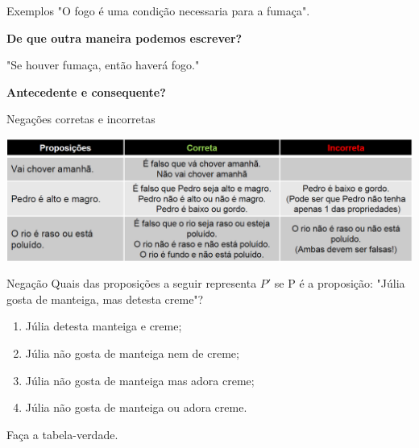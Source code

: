 \documentclass[aspectratio=169]{beamer}
\begin{document}
\begin{frame}{Exemplos}
    "O fogo é uma condição necessaria para a fumaça".
    \vspace{1cm}

    \textbf{De que outra maneira podemos escrever?}
    \vspace{1cm}

    "Se houver fumaça, então haverá fogo."
    \vspace{1.5cm}

    \textbf{Antecedente e consequente?}

\end{frame}

\begin{frame}{Negações corretas e incorretas}

    \begin{center}
        \includegraphics[width=.8\linewidth]{figs/tabelanegacoes.png}
    \end{center}

\end{frame}

\begin{frame}{Negação}
    Quais das proposições a seguir representa $P'$ se P é a proposição: "Júlia gosta de manteiga, mas detesta creme"?
    \vspace{5mm}
    \begin{enumerate}[A]
        \item Júlia detesta manteiga e creme;
        \item Júlia não gosta de manteiga nem de creme;
        \item Júlia não gosta de manteiga mas adora creme;
        \item Júlia não gosta de manteiga ou adora creme.
    \end{enumerate}

    \vspace{5mm}

    Faça a tabela-verdade.
\end{frame}
\end{document}
